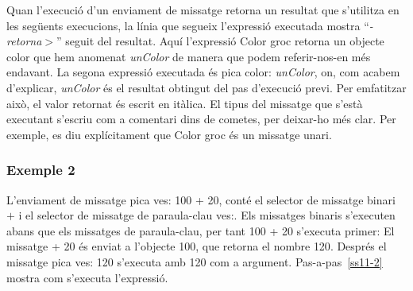 Quan l'execució d'un enviament de missatge retorna un resultat que s'utilitza en les següents execucions, la línia que segueix l'expressió executada mostra ``\textsf{{\itshape -retorna$>$}}'' seguit del resultat. Aquí l'expressió \textsf{Color groc} retorna un objecte color que hem anomenat \textsf{{\itshape unColor}} de manera que podem referir-nos-en més endavant. La segona expressió executada és \textsf{pica color: {\itshape unColor}}, on, com acabem d'explicar, \textsf{{\itshape unColor}} és el resultat obtingut del pas d'execució previ. Per emfatitzar això, el valor retornat és escrit en itàlica. El tipus del missatge que s'està executant s'escriu com a comentari dins de cometes, per deixar-ho més clar. Per exemple, es diu explícitament que \textsf{Color groc} és un missatge unari.

\subsubsection*{Exemple 2}
L'enviament de missatge \textsf{pica ves: 100 + 20}, conté el selector de missatge binari \textsf{$+$} i el selector de missatge de paraula-clau \textsf{ves:}.
Els missatges binaris s'executen abans que els missatges de paraula-clau, per tant \textsf{100 + 20} s'executa primer: El missatge \textsf{+ 20} és enviat a l'objecte \textsf{100}, que retorna el nombre \textsf{120}. Després el missatge \textsf{pica ves: 120} s'executa amb 120 com a argument. Pas-a-pas~\ref{ss11-2} mostra com s'executa l'expressió.

